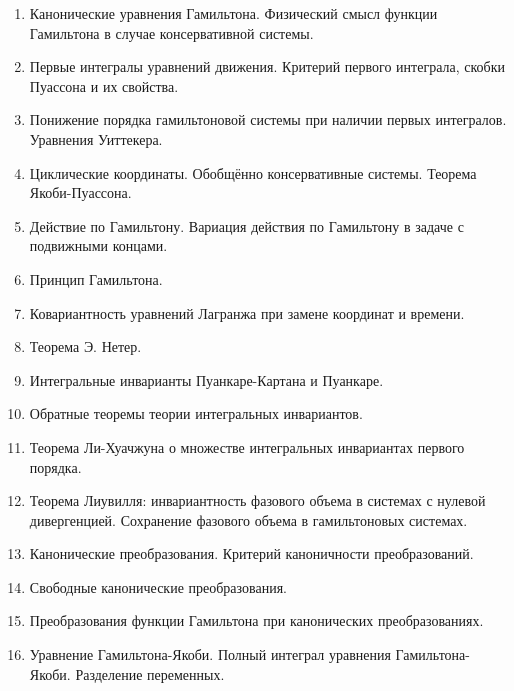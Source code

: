 \documentclass[a4paper,12pt]{article}
\begin{document}
\begin{enumerate}
	\item Канонические  уравнения  Гамильтона.  Физический смысл функции Гамильтона в случае консервативной системы.
	
	\item Первые интегралы уравнений движения. Критерий первого интеграла, скобки Пуассона и их свойства.
	
	
	\item Понижение порядка гамильтоновой системы при наличии первых интегралов. Уравнения Уиттекера.
	
	\item Циклические координаты. Обобщённо консервативные системы. Теорема Якоби-Пуассона.
	
	\item Действие по Гамильтону. Вариация  действия по Гамильтону в задаче с подвижными концами.
	
	
	\item Принцип Гамильтона.
	
	\item Ковариантность уравнений Лагранжа при замене координат и времени.
	
	\item Теорема Э. Нетер.
	
	\item Интегральные  инварианты Пуанкаре-Картана и Пуанкаре.
	
	\item Обратные  теоремы  теории  интегральных  инвариантов.
	
	\item Теорема Ли-Хуачжуна о множестве интегральных инвариантах первого порядка.
	
	\item Теорема Лиувилля: инвариантность фазового объема в системах с нулевой дивергенцией. Сохранение фазового объема в гамильтоновых системах.
	
	\item Канонические преобразования. Критерий каноничности преобразований.
	
	\item Свободные канонические преобразования.
	
	\item Преобразования функции Гамильтона при канонических преобразованиях.
	
	\item Уравнение Гамильтона-Якоби. Полный интеграл уравнения Гамильтона-Якоби. Разделение переменных.
\end{enumerate}
\end{document}
